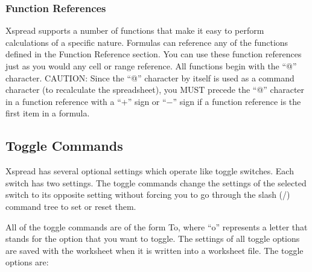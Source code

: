 \subsubsection*{Function References}

    Xspread supports a number of functions that make it easy to perform 
calculations of a specific nature.  Formulas can reference any of the 
functions defined in the Function Reference section.  You can use these 
function references just as you would any cell or range reference.  All 
functions begin with the ``@'' character.  CAUTION:  Since the ``@''
character by itself is used as a command character (to recalculate the
spreadsheet), you MUST precede the ``@'' character in a function reference
with a ``$+$'' sign or ``$-$'' sign if a function reference is the first
item in a formula.


\subsection*{Toggle Commands}

    Xspread has several optional settings which operate like toggle switches.  
Each switch has two settings.  The toggle commands change the settings of the 
selected switch to its opposite setting without forcing you to go through the 
slash (/) command tree to set or reset them.

    All of the toggle commands are of the form \ctrl To, where ``o'' 
represents a
letter that stands for the option that you want to toggle.  The settings of 
all toggle options are saved with the worksheet when it is written into a 
worksheet file.  The toggle options are:

